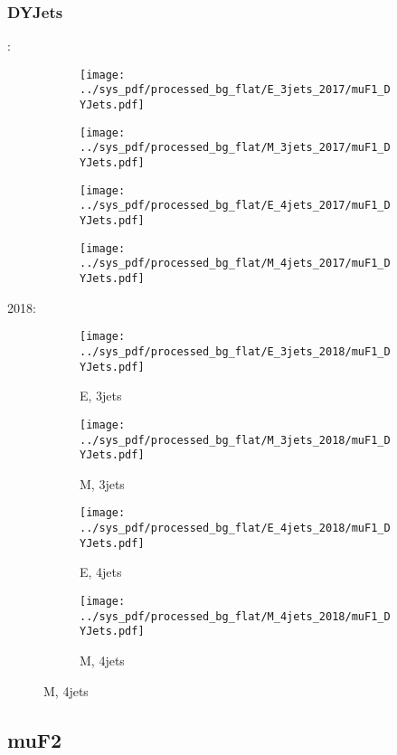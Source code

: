 \documentclass{beamer}
\begin{document}
\begin{frame}
\frametitle{DYJets}
\fontsize{5}{1}:
\begin{figure}
\centering
\begin{subfigure}[b]{0.24\textwidth}
\texttt{[image: ../sys\_pdf/processed\_bg\_flat/E\_3jets\_2017/muF1\_DYJets.pdf]}
\end{subfigure}
\begin{subfigure}[b]{0.24\textwidth}
\texttt{[image: ../sys\_pdf/processed\_bg\_flat/M\_3jets\_2017/muF1\_DYJets.pdf]}
\end{subfigure}
\begin{subfigure}[b]{0.24\textwidth}
\texttt{[image: ../sys\_pdf/processed\_bg\_flat/E\_4jets\_2017/muF1\_DYJets.pdf]}
\end{subfigure}
\begin{subfigure}[b]{0.24\textwidth}
\texttt{[image: ../sys\_pdf/processed\_bg\_flat/M\_4jets\_2017/muF1\_DYJets.pdf]}
\end{subfigure}
\end{figure}
2018:
\begin{figure}
\centering
\begin{subfigure}[b]{0.24\textwidth}
\texttt{[image: ../sys\_pdf/processed\_bg\_flat/E\_3jets\_2018/muF1\_DYJets.pdf]}
\captionsetup{font=tiny}
\caption{E, 3jets}
\end{subfigure}
\begin{subfigure}[b]{0.24\textwidth}
\texttt{[image: ../sys\_pdf/processed\_bg\_flat/M\_3jets\_2018/muF1\_DYJets.pdf]}
\captionsetup{font=tiny}
\caption{M, 3jets}
\end{subfigure}
\begin{subfigure}[b]{0.24\textwidth}
\texttt{[image: ../sys\_pdf/processed\_bg\_flat/E\_4jets\_2018/muF1\_DYJets.pdf]}
\captionsetup{font=tiny}
\caption{E, 4jets}
\end{subfigure}
\begin{subfigure}[b]{0.24\textwidth}
\texttt{[image: ../sys\_pdf/processed\_bg\_flat/M\_4jets\_2018/muF1\_DYJets.pdf]}
\captionsetup{font=tiny}
\caption{M, 4jets}
\end{subfigure}
\end{figure}
\end{frame}


\subsection{muF2}
\end{document}
